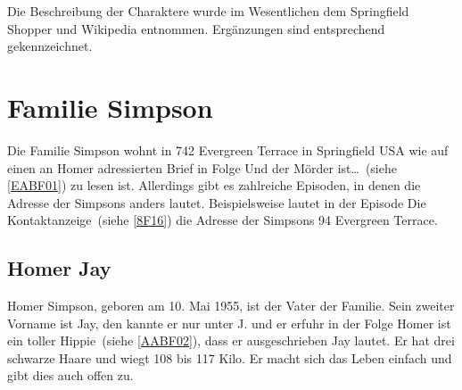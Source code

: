 Die Beschreibung der Charaktere wurde im Wesentlichen dem Springfield Shopper \cite{SpringfieldShopper} und Wikipedia \cite{Wikipedia} entnommen. Ergänzungen sind entsprechend gekennzeichnet.

\section{Familie Simpson}
Die Familie Simpson wohnt in 742 Evergreen Terrace in Springfield USA wie auf einen an Homer adressierten Brief in Folge \glqq Und der Mörder ist\dots\grqq\ (siehe \ref{EABF01}) zu lesen ist. Allerdings gibt es zahlreiche Episoden, in denen die Adresse der Simpsons anders lautet. Beispielsweise lautet in der Episode \glqq Die Kontaktanzeige\grqq\ (siehe \ref{8F16}) die Adresse der Simpsons 94 Evergreen Terrace.


\subsection{Homer Jay}\label{HomerSimpson}
Homer Simpson, geboren am 10. Mai 1955, ist der Vater der Familie. Sein zweiter Vorname ist Jay, den kannte er nur unter J. und er erfuhr in der Folge \glqq Homer ist ein toller Hippie\grqq\ (siehe \ref{AABF02}), dass er ausgeschrieben Jay lautet. Er hat drei schwarze Haare und wiegt 108 bis 117 Kilo. Er macht sich das Leben einfach und gibt dies auch offen zu.

